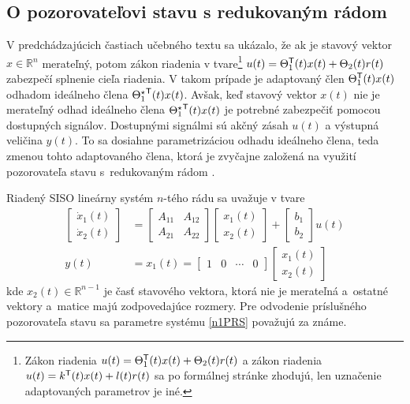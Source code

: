 \documentclass[a4paper, 10pt, ]{article}
\begin{document}
\subsection{O pozorovateľovi stavu s redukovaným rádom}





V predchádzajúcich častiach učebného textu sa ukázalo, že ak je stavový vektor $x \in \mathbb{R}^n$ merateľný, potom zákon riadenia v tvare\footnote{Zákon riadenia $u(t) = \Theta_1^{\mathsf{T}}(t) x(t) + \Theta_2(t) r(t)$ a zákon riadenia $u(t) = k^{\mathsf{T}}(t) x(t) + l(t) r(t)$ sa po formálnej stránke zhodujú, len uznačenie adaptovaných parametrov je iné.} $u(t) = \Theta_1^{\mathsf{T}}(t) x(t) + \Theta_2(t) r(t)$ zabezpečí splnenie cieľa riadenia. V takom prípade je adaptovaný člen $\Theta_1^{\mathsf{T}}(t) x(t)$ odhadom ideálneho člena ${\Theta_1^\star}^{\mathsf{T}}(t) x(t)$. Avšak, keď stavový vektor $x(t)$ nie je merateľný odhad ideálneho člena ${\Theta_1^\star}^{\mathsf{T}}(t) x(t)$ je potrebné zabezpečiť pomocou dostupných signálov. Dostupnými signálmi sú akčný zásah $u(t)$ a výstupná veličina $y(t)$. To sa dosiahne parametrizáciou odhadu ideálneho člena, teda zmenou tohto adaptovaného člena, ktorá je zvyčajne založená na využití pozorovateľa stavu s~redukovaným rádom \cite{Tao03}.





Riadený SISO lineárny systém $n$-tého rádu sa uvažuje v tvare
\begin{subequations} \label{n1PRS}
\begin{align}
	\begin{bmatrix}
		\dot{x}_1(t) \\ \dot{x}_2(t)
	\end{bmatrix}
	& =
	\begin{bmatrix}
		A_{11} & A_{12} \\ 	A_{21} & A_{22}
	\end{bmatrix}
	\begin{bmatrix}
		x_1(t) \\ x_2(t)
	\end{bmatrix}
	+
	\begin{bmatrix}
		b_1 \\ b_2
	\end{bmatrix}
	u(t)
	\\
	y(t)
	& =
	x_1(t)
	 =
	\begin{bmatrix}
		1 & 0 & \cdots & 0
	\end{bmatrix}
	\begin{bmatrix}
		x_1(t) \\ x_2(t)
	\end{bmatrix}
\end{align}
\end{subequations}
kde $x_2(t) \in \mathbb{R}^{n-1}$ je časť stavového vektora, ktorá nie je merateľná a~ostatné vektory a~matice majú zodpovedajúce rozmery. Pre odvodenie príslušného pozorovateľa stavu sa parametre systému \eqref{n1PRS} považujú za známe.
\end{document}
